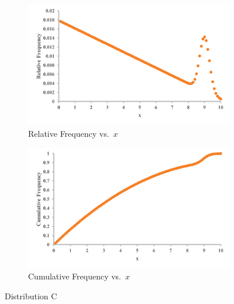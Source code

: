 \documentclass[12pt]{article}
\begin{document}
\begin{figure}[h!]
    \centering
    \begin{subfigure}[b]{0.45\textwidth}
        \includegraphics[width=\textwidth]{graphs/DistC_Rel.png}
        \caption{Relative Frequency vs.\ \(x\)}
    \end{subfigure}
    \hfill
    \begin{subfigure}[b]{0.45\textwidth}
        \includegraphics[width=\textwidth]{graphs/DistC_Cumul.png}
        \caption{Cumulative Frequency vs.\ \(x\)}
    \end{subfigure}
    \label{fig:distC}
    \caption{Distribution C}
\end{figure}
\end{document}

